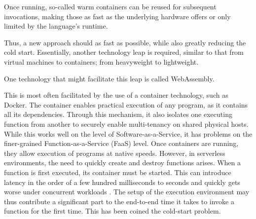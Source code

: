 Once running, so-called warm containers can be reused for subsequent invocations, making those as fast as the underlying hardware offers or only limited by the language's runtime.

Thus, a new approach should as fast as possible, while also greatly reducing the cold start. Essentially, another technology leap is required, similar to that from virtual machines to containers; from heavyweight to lightweight.

One technology that might facilitate this leap is called WebAssembly.






This is most often facilitated by the use of a container technology, such as Docker. The container enables practical execution of any program, as it contains all its dependencies. Through this mechanism, it also isolates one executing function from another to securely enable multi-tenancy on shared physical hosts. While this works well on the level of Software-as-a-Service, it has problems on the finer-grained Function-as-a-Service (FaaS) level. Once containers are running, they allow execution of programs at native speeds. However, in serverless environments, the need to quickly create and destroy functions arises. When a function is first executed, its container must be started. This can introduce latency in the order of a few hundred milliseconds to seconds \cite{Manner2018, Wang2018} and quickly gets worse under concurrent workloads \cite{Mohan2019}. The setup of the execution environment may thus contribute a significant part to the end-to-end time it takes to invoke a function for the first time. This has been coined the cold-start problem.


